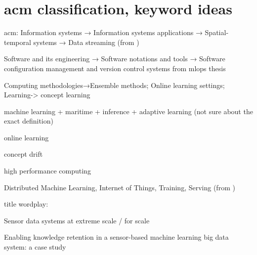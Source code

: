 \section{acm classification,  keyword ideas}

acm:
Information systems → Information systems applications →
Spatial-temporal systems → Data streaming (from \cite{uprctrajectorysystem})

Software and its engineering → Software notations and tools → Software configuration management and version control systems from mlops thesis

 Computing methodologies→Ensemble methods; Online learning settings;
 Learning->
concept learning

machine learning + maritime + inference + 
adaptive learning (not sure about the exact definition)

online learning

concept drift

high performance computing

Distributed Machine Learning, Internet of Things, Training, Serving (from \cite{mliot})

title wordplay:

Sensor data systems at extreme scale / for scale

Enabling knowledge retention in a sensor-based machine learning big data system: a case study

